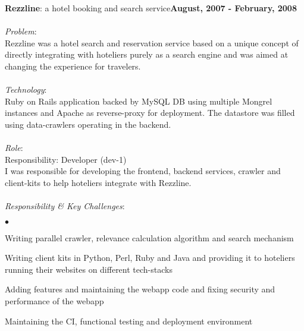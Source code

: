 \documentclass[margin,line]{res}
\newenvironment{list2}{
  \begin{list}{$\bullet$}{%
      \setlength{\itemsep}{0in}
      \setlength{\parsep}{0in} \setlength{\parskip}{0in}
      \setlength{\topsep}{0in} \setlength{\partopsep}{0in} 
      \setlength{\leftmargin}{0.2in}}}{\end{list}}
\begin{document}
\begin{resume}
{\bf Rezzline}: a hotel booking and search service\hfill {\bf August, 2007 - February, 2008}\\
\vspace{-.2cm}\\
{\em Problem}:\\
Rezzline was a hotel search and reservation service based on a unique concept of directly integrating with hoteliers purely as a search engine and was aimed at changing the experience for travelers.\\
\\
{\em Technology}:\\
Ruby on Rails application backed by MySQL DB using multiple Mongrel instances and Apache as reverse-proxy for deployment. The datastore was filled using data-crawlers operating in the backend.\\
\\
{\em Role}: \\
Responsibility: Developer (dev-1)\\
I was responsible for developing the frontend, backend services, crawler and client-kits to help hoteliers integrate with Rezzline.\\
\\
{\em Responsibility \& Key Challenges}:
\vspace*{.05in}  
\begin{list2}
\item Writing parallel crawler, relevance calculation algorithm and search mechanism
\item Writing client kits in Python, Perl, Ruby and Java and providing it to hoteliers running their websites on different tech-stacks
\item Adding features and maintaining the webapp code and fixing security and performance of the webapp
\item Maintaining the CI, functional testing  and deployment environment
\end{list2}


\end{resume}
\end{document}
